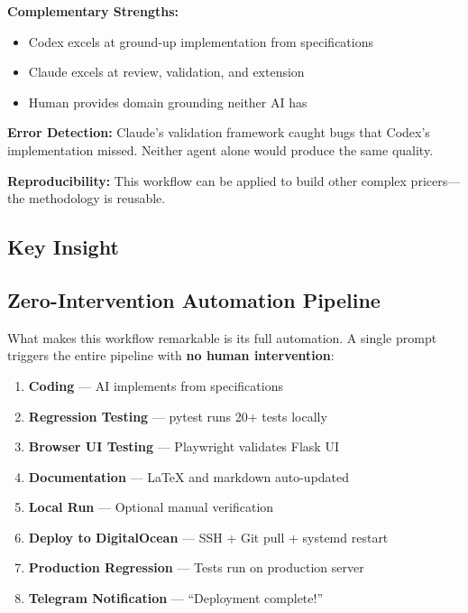 \documentclass[10pt,a4paper]{article}
\begin{document}
\textbf{Complementary Strengths:}
\begin{itemize}
    \item Codex excels at ground-up implementation from specifications
    \item Claude excels at review, validation, and extension
    \item Human provides domain grounding neither AI has
\end{itemize}

\textbf{Error Detection:}
Claude's validation framework caught bugs that Codex's implementation missed. Neither agent alone would produce the same quality.

\textbf{Reproducibility:}
This workflow can be applied to build other complex pricers---the methodology is reusable.

\subsection{Key Insight}

\begin{center}
\end{center}

\subsection{Zero-Intervention Automation Pipeline}

What makes this workflow remarkable is its full automation. A single prompt triggers the entire pipeline with \textbf{no human intervention}:

\begin{enumerate}
    \item \textbf{Coding} --- AI implements from specifications
    \item \textbf{Regression Testing} --- pytest runs 20+ tests locally
    \item \textbf{Browser UI Testing} --- Playwright validates Flask UI
    \item \textbf{Documentation} --- LaTeX and markdown auto-updated
    \item \textbf{Local Run} --- Optional manual verification
    \item \textbf{Deploy to DigitalOcean} --- SSH + Git pull + systemd restart
    \item \textbf{Production Regression} --- Tests run on production server
    \item \textbf{Telegram Notification} --- ``Deployment complete!''
\end{enumerate}
\end{document}
